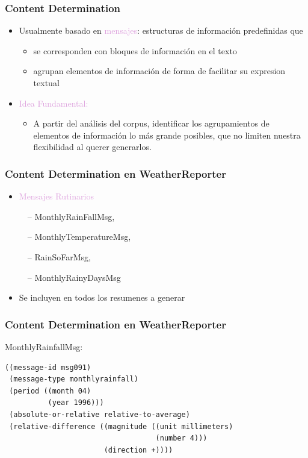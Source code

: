 \documentclass[compress,color=usenames]{beamer}
\newcommand{\mH}[1]{\textcolor{Plum}{#1}}
\begin{document}
\begin{frame}
\frametitle{Content Determination}

\label{f124}
\begin{itemize}
\item { {Usualmente basado en \mH{mensajes}: estructuras de informaci\'on predefinidas que}}
\begin{itemize}
\item se corresponden con bloques de informaci\'on en el texto
\item agrupan elementos de informaci\'on de forma de facilitar su expresion textual
\end{itemize}

\item { \mH{Idea Fundamental:}}
\begin{itemize}
\item A partir del an\'alisis del corpus, identificar los agrupamientos de elementos de informaci\'on lo m\'as grande posibles, que no limiten nuestra flexibilidad al querer generarlos.  
\end{itemize}
\end{itemize}
 
\end{frame}

\begin{frame}
\frametitle{Content Determination en WeatherReporter}

\begin{itemize}
\item { \mH{Mensajes Rutinarios}}

\ \ -- MonthlyRainFallMsg, 

\ \ -- MonthlyTemperatureMsg, 

\ \ -- RainSoFarMsg, 

\ \ -- MonthlyRainyDaysMsg

\item Se incluyen en todos los resumenes a generar
\end{itemize}

 
\end{frame}

\begin{frame}[fragile]
\frametitle{Content Determination en WeatherReporter}

 { {MonthlyRainfallMsg:}}
\begin{verbatim}
((message-id msg091)
 (message-type monthlyrainfall)
 (period ((month 04)
          (year 1996)))
 (absolute-or-relative relative-to-average)
 (relative-difference ((magnitude ((unit millimeters)
                                   (number 4)))
                       (direction +))))
\end{verbatim}

\end{frame}
\end{document}
